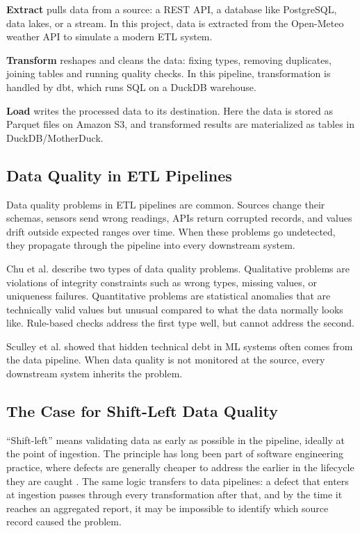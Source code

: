 \documentclass[12pt]{article}
\begin{document}
\textbf{Extract} pulls data from a source: a REST API, a database like PostgreSQL, data lakes, or a stream. In this project, data is extracted from the Open-Meteo weather API \cite{openmeteo2022} to simulate a modern ETL system.

\textbf{Transform} reshapes and cleans the data: fixing types, removing duplicates, joining tables and running quality checks. In this pipeline, transformation is handled by dbt, which runs SQL on a DuckDB warehouse.

\textbf{Load} writes the processed data to its destination. Here the data is stored as Parquet files on Amazon S3, and transformed results are materialized as tables in DuckDB/MotherDuck.

\subsection{Data Quality in ETL Pipelines}

Data quality problems in ETL pipelines are common. Sources change their schemas, sensors send wrong readings, APIs return corrupted records, and values drift outside expected ranges over time. When these problems go undetected, they propagate through the pipeline into every downstream system.

Chu et al. \cite{chu2016datacleaning} describe two types of data quality problems. Qualitative problems are violations of integrity constraints such as wrong types, missing values, or uniqueness failures. Quantitative problems are statistical anomalies that are technically valid values but unusual compared to what the data normally looks like. Rule-based checks address the first type well, but cannot address the second.

Sculley et al. \cite{sculley2015hidden} showed that hidden technical debt in ML systems often comes from the data pipeline. When data quality is not monitored at the source, every downstream system inherits the problem.

\subsection{The Case for Shift-Left Data Quality}

``Shift-left'' means validating data as early as possible in the pipeline, ideally at the point of ingestion. The principle has long been part of software engineering practice, where defects are generally cheaper to address the earlier in the lifecycle they are caught \cite{datakitchen2023shiftleft}. The same logic transfers to data pipelines: a defect that enters at ingestion passes through every transformation after that, and by the time it reaches an aggregated report, it may be impossible to identify which source record caused the problem.
\end{document}
